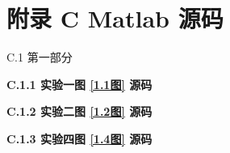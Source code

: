 \documentclass[UTF8]{article}
\theoremstyle{MyLineTheoremStyle} %
\theoremstyle{MyBlockTheoremStyle} %
\theoremstyle{MySubsubsectionStyle} %
\begin{document}
\begin{figure}[H]\centering
    
\end{figure}



\section*{附录 C\hspace*{20pt} Matlab 源码}
\thispagestyle{fancy} 

{\normalfont\Large\bfseries\boldmath 
\begin{center}
    C.1 第一部分
\end{center}
}

{\noindent\normalfont\large\bfseries\boldmath C.1.1 实验一图 \ref{1.1图} 源码}\label{1.1源码}


{\noindent\normalfont\large\bfseries\boldmath C.1.2 实验二图 \ref{1.2图} 源码}\label{1.2源码}


{\noindent\normalfont\large\bfseries\boldmath C.1.3 实验四图 \ref{1.4图} 源码}\label{1.4源码}

\end{document}
